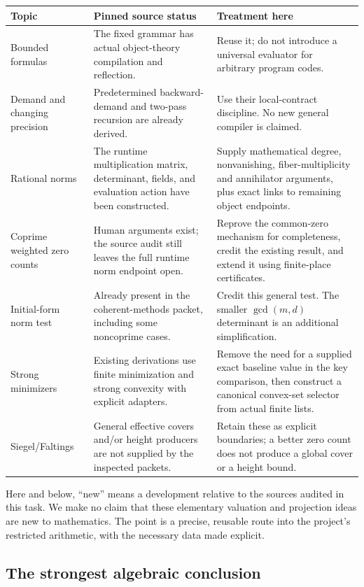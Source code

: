 \begin{longtable}{@{}P{0.23\textwidth}P{0.34\textwidth}P{0.37\textwidth}@{}}
\toprule
Topic & Pinned source status & Treatment here\\
\midrule
\endhead
Bounded formulas & The fixed grammar has actual object-theory compilation and reflection. & Reuse it; do not introduce a universal evaluator for arbitrary program codes.\\[5pt]
Demand and changing precision & Predetermined backward-demand and two-pass recursion are already derived. & Use their local-contract discipline. No new general compiler is claimed.\\[5pt]
Rational norms & The runtime multiplication matrix, determinant, fields, and evaluation action have been constructed. & Supply mathematical degree, nonvanishing, fiber-multiplicity and annihilator arguments, plus exact links to remaining object endpoints.\\[5pt]
Coprime weighted zero counts & Human arguments exist; the source audit still leaves the full runtime norm endpoint open. & Reprove the common-zero mechanism for completeness, credit the existing result, and extend it using finite-place certificates.\\[5pt]
Initial-form norm test & Already present in the coherent-methods packet, including some noncoprime cases. & Credit this general test. The smaller $\gcd(m,d)$ determinant is an additional simplification.\\[5pt]
Strong minimizers & Existing derivations use finite minimization and strong convexity with explicit adapters. & Remove the need for a supplied exact baseline value in the key comparison, then construct a canonical convex-set selector from actual finite lists.\\[5pt]
Siegel/Faltings & General effective covers and/or height producers are not supplied by the inspected packets. & Retain these as explicit boundaries; a better zero count does not produce a global cover or a height bound.\\
\bottomrule
\end{longtable}

Here and below, ``new'' means a development relative to the sources audited in this task. We make no claim that these elementary valuation and projection ideas are new to mathematics. The point is a precise, reusable route into the project's restricted arithmetic, with the necessary data made explicit.

\subsection{The strongest algebraic conclusion}

